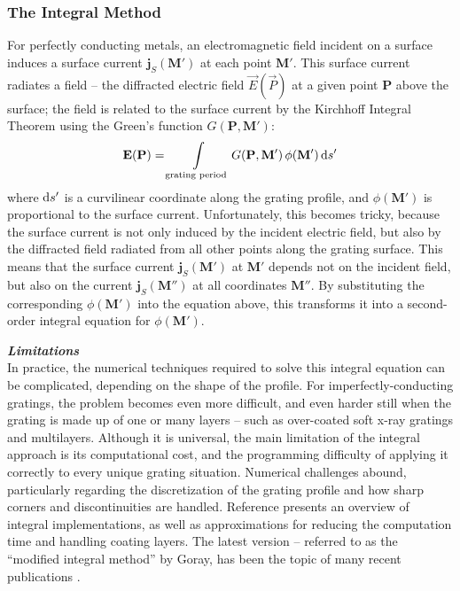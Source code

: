 \subsubsection{The Integral Method}
For perfectly conducting metals, an electromagnetic field incident on a surface induces a surface current $\mathbf{j}_S(\mathbf{M}')$ at each point $\mathbf{M}'$.  This surface current radiates a field -- the diffracted electric field $\vec E(\vec P)$ at a given point $\mathbf{P}$ above the surface; the field is related to the surface current by the Kirchhoff Integral Theorem \cite{Kir83} using the Green's function $G(\mathbf{P}, \mathbf{M}')$:
\begin{align}
\mathbf{E}(\mathbf{P}) = \int\limits_{\textrm{grating period}} G(\mathbf{P}, \mathbf{M}')\, \phi(\mathbf{M}')\, \mathrm{d} s'
\end{align}
where $\mathrm{d} s'$ is a curvilinear coordinate along the grating profile, and $\phi(\mathbf{M'})$ is proportional to the surface current.  Unfortunately, this becomes tricky, because the surface current is not only induced by the incident electric field, but also by the diffracted field radiated from all other points along the grating surface.  This means that the surface current $\mathbf{j}_S(\mathbf{M}')$ at $\mathbf{M}'$ depends not on the incident field, but also on the current $\mathbf{j}_S(\mathbf{M}'')$ at all coordinates $\mathbf{M}''$.  By substituting the corresponding $\phi(\mathbf{M'})$ into the equation above, this transforms it into a second-order integral equation for $\phi(\mathbf{M'})$.
 
\noindent\textbf{\emph{Limitations}}\\
In practice, the numerical techniques required to solve this integral equation can be complicated, depending on the shape of the profile.  For imperfectly-conducting gratings, the problem becomes even more difficult, and even harder still when the grating is made up of one or many layers -- such as over-coated soft x-ray gratings and multilayers.  Although it is universal, the main limitation of the integral approach is its computational cost, and the programming difficulty of applying it correctly to every unique grating situation. Numerical challenges abound, particularly regarding the discretization of the grating profile and how sharp corners and discontinuities are handled.  Reference \cite{Pom91} presents an overview of integral implementations, as well as approximations for reducing the computation time and handling coating layers. The latest version -- referred to as the ``modified integral method'' by Goray, has been the topic of many recent publications \cite{Gor02,Gor02b,See02,Gor05}.
 
